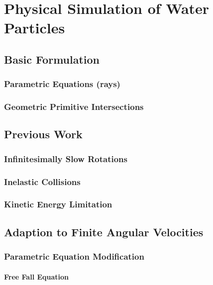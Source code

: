 						\chapter{Physical Simulation of Water Particles}

\section{Basic Formulation}

	\subsection{Parametric Equations (rays)}

	\subsection{Geometric Primitive Intersections}

\section{Previous Work}

	\subsection{Infinitesimally Slow Rotations}

	\subsection{Inelastic Collisions}

	\subsection{Kinetic Energy Limitation}

\section{Adaption to Finite Angular Velocities}

	\subsection{Parametric Equation Modification}

		\subsubsection{Free Fall Equation}

